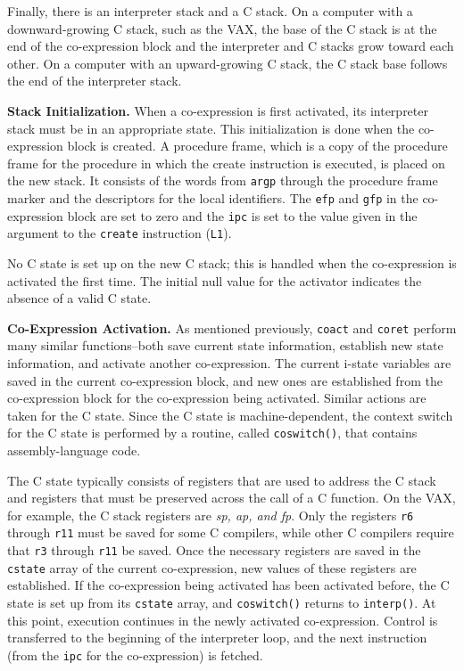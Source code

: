 Finally, there is an interpreter stack and a C stack. On a computer
with a downward-growing C stack, such as the VAX, the base of the C
stack is at the end of the co-expression block and the interpreter and
C stacks grow toward each other. On a computer with an upward-growing
C stack, the C stack base follows the end of the interpreter stack.

\textbf{Stack Initialization.} When a co-expression is first
activated, its interpreter stack must be in an appropriate state. This
initialization is done when the co-expression block is created. A
procedure frame, which is a copy of the procedure frame for the
procedure in which the create instruction is executed, is placed on
the new stack. It consists of the words from \texttt{argp} through the
procedure frame marker and the descriptors for the local
identifiers. The \texttt{efp} and \texttt{gfp} in the co-expression
block are set to zero and the \texttt{ipc} is set to the value given
in the argument to the \texttt{create} instruction (\texttt{L1}).

No C state is set up on the new C stack; this is handled when the
co-expression is activated the first time. The initial null value for
the activator indicates the absence of a valid C state.


\textbf{Co-Expression Activation.} As mentioned previously,
\texttt{coact} and \texttt{coret} perform many similar functions--both
save current state information, establish new state information, and
activate another co-expression.  The current i-state variables are
saved in the current co-expression block, and new ones are established
from the co-expression block for the co-expression being
activated. Similar actions are taken for the C state. Since the C
state is machine-dependent, the {\textquotedbl}context
switch{\textquotedbl} for the C state is performed by a routine,
called \texttt{coswitch()}, that contains assembly-language code.

The C state typically consists of registers that are used to address
the C stack and registers that must be preserved across the call of a
C function. On the VAX, for example, the C stack registers are
\textit{sp, ap, and fp}. Only the registers \texttt{r6} through
\texttt{r11} must be saved for some C compilers, while other C
compilers require that \texttt{r3} through \texttt{r11} be saved. Once
the necessary registers are saved in the \texttt{cstate} array of the
current co-expression, new values of these registers are
established. If the co-expression being activated has been activated
before, the C state is set up from its \texttt{cstate} array, and
\texttt{coswitch()} returns to \texttt{interp()}. At this point,
execution continues in the newly activated co-expression. Control is
transferred to the beginning of the interpreter loop, and the next
instruction (from the \texttt{ipc} for the co-expression) is fetched.

